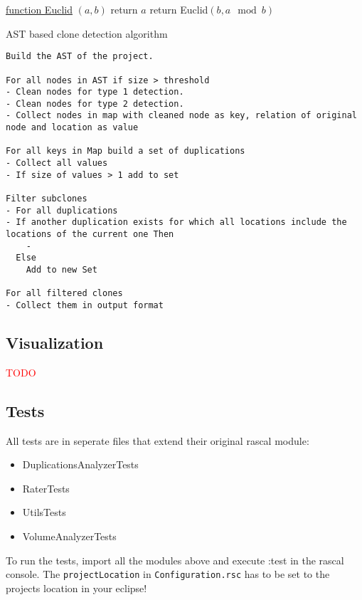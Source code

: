 \documentclass{uva-inf-article}
\newcommand\todo[1]{\textcolor{red}{#1}}
\begin{document}
\begin{algorithm}

    \underline{function Euclid} $(a,b)$\;
      {
        return $a$\;
      }
      {
        return Euclid$(b,a\mod b)$\;
      }
    \caption{AST based clone detection algorithm}
\end{algorithm}

\begin{verbatim}
Build the AST of the project.

For all nodes in AST if size > threshold
- Clean nodes for type 1 detection.
- Clean nodes for type 2 detection.
- Collect nodes in map with cleaned node as key, relation of original node and location as value

For all keys in Map build a set of duplications
- Collect all values
- If size of values > 1 add to set

Filter subclones
- For all duplications
- If another duplication exists for which all locations include the locations of the current one Then
    -
  Else
    Add to new Set
    
For all filtered clones
- Collect them in output format
\end{verbatim}


\subsection{Visualization}

\todo{TODO}


\subsection{Tests}

All tests are in seperate files that extend their original rascal
module:

\begin{itemize}

\item
  DuplicationsAnalyzerTests
\item
  RaterTests
\item
  UtilsTests
\item
  VolumeAnalyzerTests
\end{itemize}

To run the tests, import all the modules above and execute :test in the
rascal console. The \texttt{projectLocation} in
\texttt{Configuration.rsc} has to be set to the projects location in
your eclipse!
\end{document}

